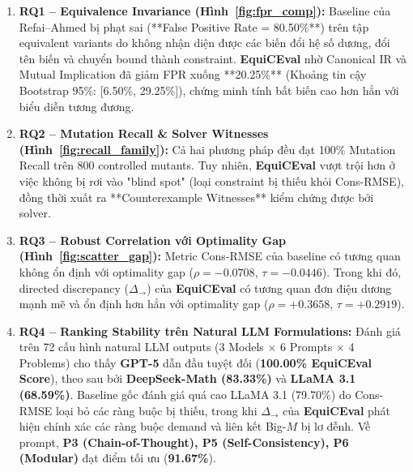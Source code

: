 \documentclass[11pt,a4paper]{article}
\newcommand{\method}{\textsf{\textbf{EquiCEval}}\xspace}
\begin{document}
\begin{enumerate}
  \item \textbf{RQ1 -- Equivalence Invariance (Hình~\ref{fig:fpr_comp}):}
  Baseline của Refai--Ahmed bị phạt sai (**False Positive Rate = 80.50\%**) trên tập equivalent variants do không nhận diện được các biến đổi hệ số dương, đổi tên biến và chuyển bound thành constraint. \method nhờ Canonical IR và Mutual Implication đã giảm FPR xuống **20.25\%** (Khoảng tin cậy Bootstrap 95\%: [6.50\%, 29.25\%]), chứng minh tính bất biến cao hơn hẳn với biểu diễn tương đương.

  \item \textbf{RQ2 -- Mutation Recall \& Solver Witnesses (Hình~\ref{fig:recall_family}):}
  Cả hai phương pháp đều đạt 100\% Mutation Recall trên 800 controlled mutants. Tuy nhiên, \method vượt trội hơn ở việc không bị rơi vào "blind spot" (loại constraint bị thiếu khỏi Cons-RMSE), đồng thời xuất ra **Counterexample Witnesses** kiểm chứng được bởi solver.

  \item \textbf{RQ3 -- Robust Correlation với Optimality Gap (Hình~\ref{fig:scatter_gap}):}
  Metric Cons-RMSE của baseline có tương quan không ổn định với optimality gap ($\rho = -0.0708$, $\tau = -0.0446$). Trong khi đó, directed discrepancy ($\Delta_{\rightarrow}$) của \method có tương quan đơn điệu dương mạnh mẽ và ổn định hơn hẳn với optimality gap ($\rho = +0.3658$, $\tau = +0.2919$).

  \item \textbf{RQ4 -- Ranking Stability trên Natural LLM Formulations:}
  Đánh giá trên 72 cấu hình natural LLM outputs (3 Models $\times$ 6 Prompts $\times$ 4 Problems) cho thấy \textbf{GPT-5} dẫn đầu tuyệt đối (\textbf{100.00\% EquiCEval Score}), theo sau bởi \textbf{DeepSeek-Math (83.33\%)} và \textbf{LLaMA 3.1 (68.59\%)}. Baseline gốc đánh giá quá cao LLaMA 3.1 (79.70\%) do Cons-RMSE loại bỏ các ràng buộc bị thiếu, trong khi $\Delta_{\rightarrow}$ của \method phát hiện chính xác các ràng buộc demand và liên kết Big-$M$ bị lơ đễnh. Về prompt, \textbf{P3 (Chain-of-Thought), P5 (Self-Consistency), P6 (Modular)} đạt điểm tối ưu (\textbf{91.67\%}).


\end{enumerate}
\end{document}

